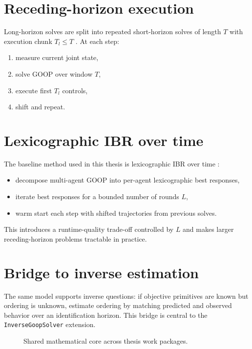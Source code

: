 \section{Receding-horizon execution}

Long-horizon solves are split into repeated short-horizon solves of length $T$
with execution chunk $T_l \le T$ \cite{christophersen:2007,hall:2022}. At each
step:

\begin{enumerate}
    \item measure current joint state,
    \item solve GOOP over window $T$,
    \item execute first $T_l$ controls,
    \item shift and repeat.
\end{enumerate}

\section{Lexicographic IBR over time}

The baseline method used in this thesis is lexicographic IBR over time
\cite{delasheras:2025}:

\begin{itemize}
    \item decompose multi-agent GOOP into per-agent lexicographic best
    responses,
    \item iterate best responses for a bounded number of rounds $L$,
    \item warm start each step with shifted trajectories from previous solves.
\end{itemize}

This introduces a runtime-quality trade-off controlled by $L$ and makes larger
receding-horizon problems tractable in practice.

\section{Bridge to inverse estimation}

The same model supports inverse questions: if objective primitives are known but
ordering is unknown, estimate ordering by matching predicted and observed
behavior over an identification horizon. This bridge is central to the
\texttt{InverseGoopSolver} extension.

\begin{figure}[tbp]
    \centering
    \caption{Shared mathematical core across thesis work packages.}
    \label{fig:shared_core}
\end{figure}

